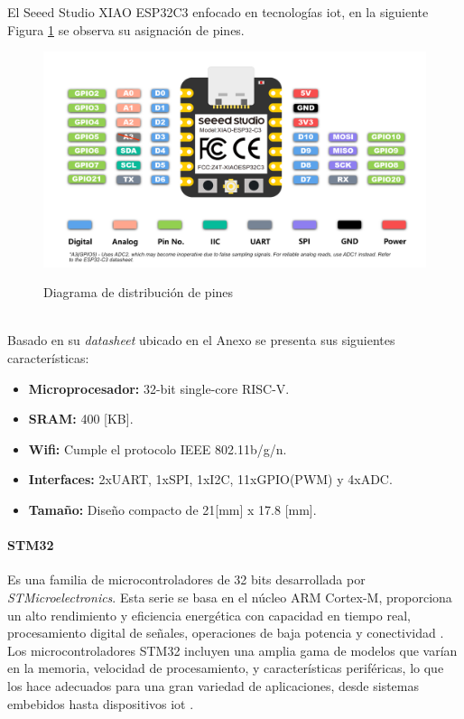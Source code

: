 El Seeed Studio XIAO ESP32C3 enfocado en tecnologías \acrshort{iot}, en la siguiente Figura \ref{fig:esp32} se observa su asignación de pines.
\begin{figure}[!htb]
    \centering
    \caption{Diagrama de distribución de pines} %
    {\includegraphics[width=0.8\columnwidth]{Figuras/esp32.png}}\\
    \label{fig:esp32}
\end{figure}
\\
Basado en su \textit{datasheet} ubicado en el Anexo  se presenta sus siguientes características:
\begin{itemize}
    \item \textbf{Microprocesador:} 32-bit single-core RISC-V.
    \item \textbf{SRAM:} 400 [KB].
    \item \textbf{Wifi:} Cumple el protocolo IEEE 802.11b/g/n.
    \item \textbf{Interfaces:} 2xUART, 1xSPI, 1xI2C, 11xGPIO(PWM) y 4xADC.
    \item \textbf{Tamaño:} Diseño compacto de 21[mm] x 17.8 [mm].
\end{itemize}

\paragraph{STM32}

Es una familia de microcontroladores de 32 bits desarrollada por \textit{STMicroelectronics}. Esta serie se basa en el núcleo ARM Cortex-M, proporciona un alto rendimiento y eficiencia energética con capacidad en tiempo real, procesamiento digital de señales, operaciones de baja potencia y conectividad . Los microcontroladores STM32 incluyen una amplia gama de modelos que varían en la memoria, velocidad de procesamiento, y características periféricas, lo que los hace adecuados para una gran variedad de aplicaciones, desde sistemas embebidos hasta dispositivos \acrshort{iot} \citep{stm32}.

